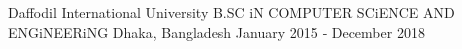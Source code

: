
\begin{cventries}
\cventry
    {Daffodil International University}
    {B.SC iN COMPUTER SCiENCE AND ENGiNEERiNG}
    {Dhaka, Bangladesh}
    {January 2015 ‑ December 2018}
    {
    }
\end{cventries}
